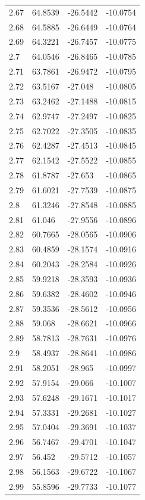 \begin{tabular}{llll}
2.67 & 64.8539 & -26.5442 & -10.0754 \\
2.68 & 64.5885 & -26.6449 & -10.0764 \\
2.69 & 64.3221 & -26.7457 & -10.0775 \\
2.7 & 64.0546 & -26.8465 & -10.0785 \\
2.71 & 63.7861 & -26.9472 & -10.0795 \\
2.72 & 63.5167 & -27.048 & -10.0805 \\
2.73 & 63.2462 & -27.1488 & -10.0815 \\
2.74 & 62.9747 & -27.2497 & -10.0825 \\
2.75 & 62.7022 & -27.3505 & -10.0835 \\
2.76 & 62.4287 & -27.4513 & -10.0845 \\
2.77 & 62.1542 & -27.5522 & -10.0855 \\
2.78 & 61.8787 & -27.653 & -10.0865 \\
2.79 & 61.6021 & -27.7539 & -10.0875 \\
2.8 & 61.3246 & -27.8548 & -10.0885 \\
2.81 & 61.046 & -27.9556 & -10.0896 \\
2.82 & 60.7665 & -28.0565 & -10.0906 \\
2.83 & 60.4859 & -28.1574 & -10.0916 \\
2.84 & 60.2043 & -28.2584 & -10.0926 \\
2.85 & 59.9218 & -28.3593 & -10.0936 \\
2.86 & 59.6382 & -28.4602 & -10.0946 \\
2.87 & 59.3536 & -28.5612 & -10.0956 \\
2.88 & 59.068 & -28.6621 & -10.0966 \\
2.89 & 58.7813 & -28.7631 & -10.0976 \\
2.9 & 58.4937 & -28.8641 & -10.0986 \\
2.91 & 58.2051 & -28.965 & -10.0997 \\
2.92 & 57.9154 & -29.066 & -10.1007 \\
2.93 & 57.6248 & -29.1671 & -10.1017 \\
2.94 & 57.3331 & -29.2681 & -10.1027 \\
2.95 & 57.0404 & -29.3691 & -10.1037 \\
2.96 & 56.7467 & -29.4701 & -10.1047 \\
2.97 & 56.452 & -29.5712 & -10.1057 \\
2.98 & 56.1563 & -29.6722 & -10.1067 \\
2.99 & 55.8596 & -29.7733 & -10.1077 \\

\end{tabular}
